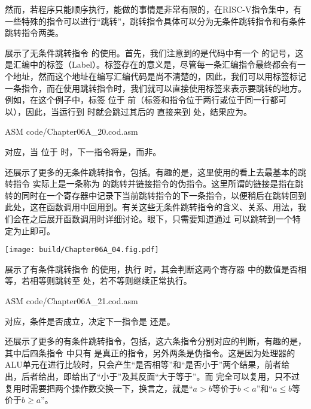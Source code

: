 然而，若程序只能顺序执行，能做的事情是非常有限的，在RISC-V指令集中，有一些特殊的指令可以进行“跳转”，跳转指令具体可以分为无条件跳转指令和有条件跳转指令两类。

展示了无条件跳转指令 的使用。首先，我们注意到的是代码中有一个 的记号，这是汇编中的标签（Label）。标签存在的意义是，尽管每一条汇编指令最终都会有一个地址，然而这个地址在编写汇编代码是尚不清楚的，因此，我们可以用标签标记一条指令，而在使用跳转指令时，我们就可以直接使用标签来表示要跳转的地方。例如，在这个例子中，标签 位于 前（标签和指令位于两行或位于同一行都可以），因此，当运行到 时就会跳过其后的 直接来到 处，结果应为。

\begin{Code}{ASM}
    code/Chapter06A_20.cod.asm
\end{Code}

对应，当 位于 时，下一指令将是，而非。

还展示了更多的无条件跳转指令，包括。有趣的是，这里使用的看上去最基本的跳转指令 实际上是一条称为 的跳转并链接指令的伪指令。这里所谓的链接是指在跳转的同时在一个寄存器中记录下当前跳转指令的下一条指令，以便稍后在跳转回到此处，这在函数调用中回用到。有关这些无条件跳转指令的含义、关系、用法，我们会在之后展开函数调用时详细讨论。眼下，只需要知道通过 可以跳转到一个特定为止即可。
\begin{Figure}
    \texttt{[image: build/Chapter06A\_04.fig.pdf]}
\end{Figure}

展示了有条件跳转指令 的使用，执行 时，其会判断这两个寄存器 中的数值是否相等，若相等则跳转至 处，若不等则继续正常执行。
\begin{Code}{ASM}
    code/Chapter06A_21.cod.asm
\end{Code}

对应，条件是否成立，决定下一指令是 还是。

还展示了更多的有条件跳转指令，包括，这六条指令分别对应\codex{==,!=,<,<=,>,>=}的判断，有趣的是，其中后四条指令 中只有 是真正的指令，另外两条是伪指令。这是因为处理器的ALU单元在进行比较时，只会产生“是否相等”和“是否小于”两个结果，前者给出，后者给出，即给出了“小于”及其反面“大于等于”。而 完全可以复用，只不过复用时需要把两个操作数交换一下，换言之，就是“$a>b$等价于$b<a$”和“$a\leq b$等价于$b\geq a$”。

